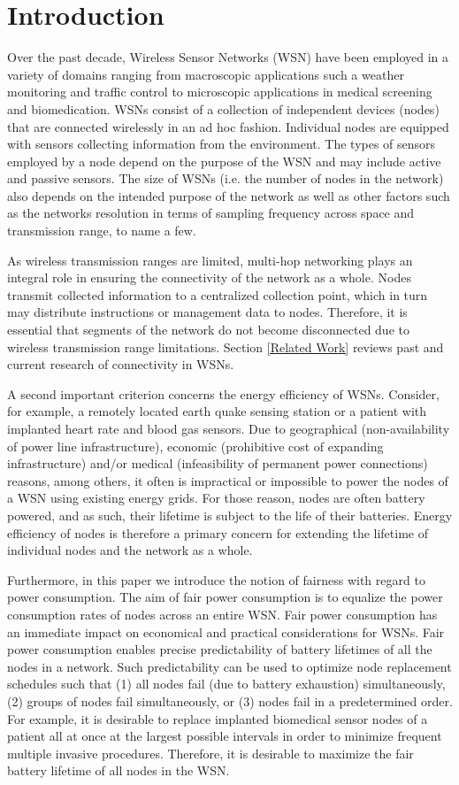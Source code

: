\section{Introduction}

Over the past decade, Wireless Sensor Networks (WSN) have been employed in a variety of domains ranging from macroscopic applications such a weather monitoring and traffic control to microscopic applications in medical screening and biomedication. WSNs consist of a collection of independent devices (nodes) that are connected wirelessly in an ad hoc fashion. Individual nodes are equipped with sensors collecting information from the environment. The types of sensors employed by a node depend on the purpose of the WSN and may include active and passive sensors. The size of WSNs (i.e. the number of nodes in the network) also depends on the intended purpose of the network as well as other factors such as the networks resolution in terms of sampling frequency across space and transmission range, to name a few.

As wireless transmission ranges are limited, multi-hop networking plays an integral role in ensuring the connectivity of the network as a whole. Nodes transmit collected information to a centralized collection point, which in turn may distribute instructions or management data to nodes. Therefore, it is essential that segments of the network do not become disconnected due to wireless transmission range limitations. Section \ref{Related Work} reviews past and current research of connectivity in WSNs.

A second important criterion concerns the energy efficiency of WSNs. Consider, for example, a remotely located earth quake sensing station or a patient with implanted heart rate and blood gas sensors. Due to geographical (non-availability of power line infrastructure), economic (prohibitive cost of expanding infrastructure) and/or medical (infeasibility of permanent power connections) reasons, among others, it often is impractical or impossible to power the nodes of a WSN using existing energy grids. For those reason, nodes are often battery powered, and as such, their lifetime is subject to the life of their batteries. Energy efficiency of nodes is therefore a primary concern for extending the lifetime of individual nodes and the network as a whole.

Furthermore, in this paper we introduce the notion of fairness with regard to power consumption. The aim of fair power consumption is to equalize the power consumption rates of nodes across an entire WSN. Fair power consumption has an immediate impact on economical and practical considerations for WSNs. Fair power consumption enables precise predictability of battery lifetimes of all the nodes in a network. Such predictability can be used to optimize node replacement schedules such that (1) all nodes fail (due to battery exhaustion) simultaneously, (2) groups of nodes fail simultaneously, or (3) nodes fail in a predetermined order. For example, it is desirable to replace implanted biomedical sensor nodes of a patient all at once at the largest possible intervals in order to minimize frequent multiple invasive procedures. Therefore, it is desirable to maximize the fair battery lifetime of all nodes in the WSN.

